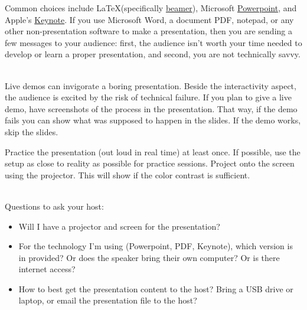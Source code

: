 Common choices include \LaTeX (specifically \href{https://en.wikipedia.org/wiki/Beamer_(LaTeX)}{beamer}), 
Microsoft \href{https://en.wikipedia.org/wiki/Microsoft_PowerPoint}{Powerpoint}, 
and Apple's \href{https://en.wikipedia.org/wiki/Keynote_(presentation_software)}{Keynote}. 
If you use Microsoft Word, a document PDF, notepad, or any other non-presentation software to make a presentation, then you are sending a few messages to your audience:
first, the audience isn't worth your time needed to develop or learn a proper presentation, and second, you are not technically savvy.

\ \\


Live demos can invigorate a boring presentation. Beside the interactivity aspect, the audience is excited by the risk of technical failure. 
If you plan to give a live demo, have screenshots of the process in the presentation. That way, if the demo fails you can show what was supposed to happen in the slides. If the demo works, skip the slides.


Practice the presentation (out loud in real time) at least once.
If possible, use the setup as close to reality as possible for practice sessions. Project onto the screen using the projector. This will show if the color contrast is sufficient.

\ \\

Questions to ask your host:
\begin{itemize}
    \item Will I have a projector and screen for the presentation?
    \item For the technology I'm using (Powerpoint, PDF, Keynote), which version is in provided? 
    Or does the speaker bring their own computer? 
    Or is there internet access?
    \item How to best get the presentation content to the host? Bring a USB drive or laptop, or email the presentation file to the host?
\end{itemize}


